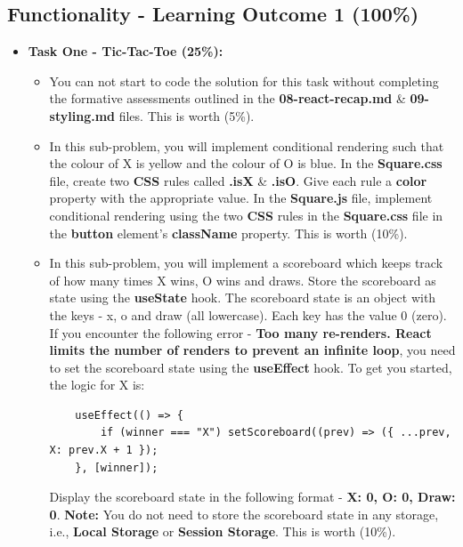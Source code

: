 \documentclass{article}
\begin{document}
\subsection*{Functionality - Learning Outcome 1 (100\%)}
\begin{itemize}
	\item \textbf{Task One - Tic-Tac-Toe (25\%):}
	      \begin{itemize}
	      	\item You can not start to code the solution for this task without completing the formative assessments outlined in the  \textbf{08-react-recap.md} \& \textbf{09-styling.md} files. This is worth (5\%).
	      	\item In this sub-problem, you will implement conditional rendering such that the colour of X is yellow and the colour of O is blue. In the \textbf{Square.css} file, create two \textbf{CSS} rules called \textbf{.isX} \& \textbf{.isO}. Give each rule a \textbf{color} property with the appropriate value. In the \textbf{Square.js} file, implement conditional rendering using the two \textbf{CSS} rules in the \textbf{Square.css} file in the \textbf{button} element's \textbf{className} property. This is worth (10\%).
	      	\item In this sub-problem, you will implement a scoreboard which keeps track of how many times X wins, O wins and draws. Store the scoreboard as state using the \textbf{useState} hook. The scoreboard state is an object with the keys - x, o and draw (all lowercase). Each key has the value 0 (zero). If you encounter the following error - \textbf{Too many re-renders. React limits the number of renders to prevent an infinite loop}, you need to set the scoreboard state using the \textbf{useEffect} hook. To get you started, the logic for X is:
	      	      \begin{verbatim}
    useEffect(() => {
        if (winner === "X") setScoreboard((prev) => ({ ...prev, X: prev.X + 1 });
    }, [winner]);
	      	      \end{verbatim}
	      	      
	      	      
	      	      Display the scoreboard state in the following format - \textbf{X: 0,  O: 0, Draw: 0}. \textbf{Note:} You do not need to store the scoreboard state in any storage, i.e., \textbf{Local Storage} or \textbf{Session Storage}. This is worth (10\%).
	      	      
	      	      
	      	      
	      \end{itemize}
	      

\end{itemize}
\end{document}
